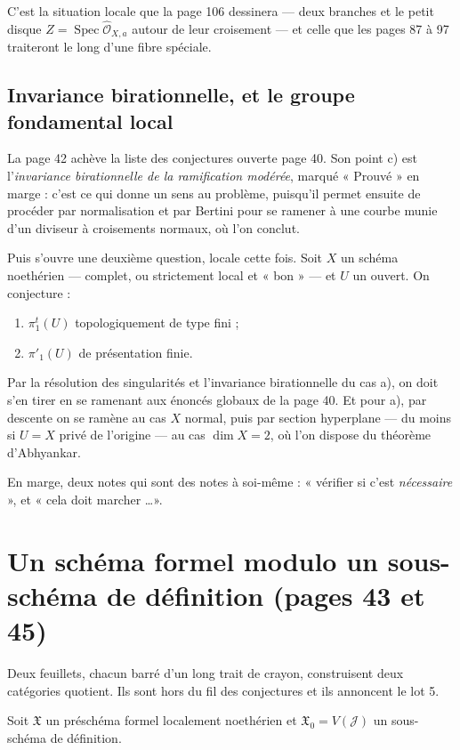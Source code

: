 \documentclass[11pt,a4paper]{article}
\begin{document}
C'est la situation locale que la page 106 dessinera --- deux branches et le
petit disque $Z = \operatorname{Spec}\hat{\mathcal{O}}_{X,a}$ autour de leur
croisement --- et celle que les pages 87 à 97 traiteront le long d'une fibre
spéciale.

\subsection*{Invariance birationnelle, et le groupe fondamental local}

La page 42 achève la liste des conjectures ouverte page 40. Son point c) est
l'\emph{invariance birationnelle de la ramification modérée}, marqué « Prouvé »
en marge : c'est ce qui donne un sens au problème, puisqu'il permet ensuite
de procéder par normalisation et par Bertini pour se ramener à une courbe munie
d'un diviseur à croisements normaux, où l'on conclut.

Puis s'ouvre une deuxième question, locale cette fois. Soit $X$ un schéma
noethérien --- complet, ou strictement local et « bon » --- et $U$ un ouvert.
On conjecture :

\begin{enumerate}
  \item[a)] $\pi^{t}_{1}(U)$ topologiquement de type fini ;
  \item[b)] $\pi'_{1}(U)$ de présentation finie.
\end{enumerate}

Par la résolution des singularités et l'invariance birationnelle du cas a), on
doit s'en tirer en se ramenant aux énoncés globaux de la page 40. Et pour a),
par descente on se ramène au cas $X$ normal, puis par section hyperplane ---
du moins si $U = X$ privé de l'origine --- au cas $\dim X = 2$, où l'on dispose
du théorème d'Abhyankar.

En marge, deux notes qui sont des notes à soi-même : « vérifier si c'est
\emph{nécessaire} », et « cela doit marcher \dots ».

\section*{Un schéma formel modulo un sous-schéma de définition (pages 43 et 45)}

Deux feuillets, chacun barré d'un long trait de crayon, construisent deux
catégories quotient. Ils sont hors du fil des conjectures et ils annoncent le
lot 5.

Soit $\mathfrak{X}$ un préschéma formel localement noethérien et
$\mathfrak{X}_{0} = V(\mathcal{J})$ un sous-schéma de définition.
\end{document}
